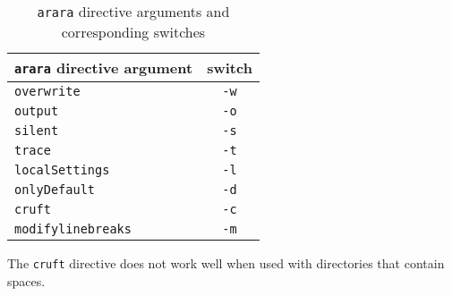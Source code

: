 	\begin{table}[!ht]
		\centering
		\caption{\texttt{arara} directive arguments and corresponding switches}
		\label{tab:orbsandswitches}
		\begin{tabular}{lc}
			\toprule
			\texttt{arara} directive argument & switch      \\
			\midrule
			\texttt{overwrite}                & \texttt{-w} \\
			\texttt{output}                   & \texttt{-o} \\
			\texttt{silent}                   & \texttt{-s} \\
			\texttt{trace}                    & \texttt{-t} \\
			\texttt{localSettings}            & \texttt{-l} \\
			\texttt{onlyDefault}              & \texttt{-d} \\
			\texttt{cruft}                    & \texttt{-c} \\
			\texttt{modifylinebreaks}         & \texttt{-m} \\
			\bottomrule
		\end{tabular}
	\end{table}

	The \texttt{cruft} directive does not work well when used with
	directories that contain spaces.


